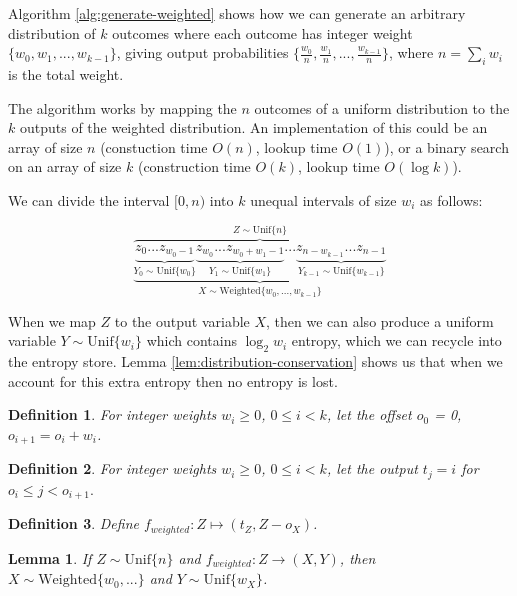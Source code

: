 \documentclass[12pt]{article}
\newtheorem{lemma}{Lemma}
\newtheorem{definition}{Definition}
\newcommand{\unif}[1]{\mathrm{Unif}\{#1\}}
\begin{document}
Algorithm \ref{alg:generate-weighted} shows how we can generate an arbitrary  distribution of $k$ outcomes where each outcome has integer weight $\{w_0, w_1, ..., w_{k-1}\}$, giving output probabilities $\{\frac{w_0}{n}, \frac{w_1}{n}, ..., \frac{w_{k-1}}{n}\}$, where $n=\sum_i w_i$ is the total weight.

The algorithm works by mapping the $n$ outcomes of a uniform distribution to the $k$ outputs of the weighted distribution. An implementation of this could be an array of size $n$ (constuction time $O(n)$, lookup time $O(1)$), or a binary search on an array of size $k$ (construction time $O(k)$, lookup time $O(\log k)$).

We can divide the interval $[0,n)$ into $k$ unequal intervals of size $w_i$ as follows:

\[
\overbrace{
    \underbrace{
        \underbrace{z_0 ... z_{w_0-1}}_{Y_0 \sim \unif{w_0}}
          \underbrace{z_{w_0} ... z_{w_0+w_1-1}}_{Y_1 \sim \unif{w_1}}
          ...
          \underbrace{
             z_{n-w_{k-1}} ... 
             z_{n-1}
         }_{Y_{k-1} \sim \unif{w_{k-1}}}
    }_{X \sim \mathrm{Weighted}\{w_0, ..., w_{k-1}\}}
}^{Z \sim \unif{n}}
\]

When we map $Z$ to the output variable $X$, then we can also produce a uniform variable $Y \sim \unif{w_i}$ which contains $\log_2w_i$ entropy, which we can recycle into the entropy store. Lemma \ref{lem:distribution-conservation} shows us that when we account for this extra entropy then no entropy is lost.

\begin{definition}
    \label{def:o}
    For integer weights $w_i \ge 0$, $0 \le i < k$, let the offset $o_0$ = 0, $o_{i+1} = o_i + w_i$.
\end{definition}

\begin{definition}
    \label{def:t}
    For integer weights $w_i \ge 0$, $0 \le i < k$, let the output $t_j = i$ for $o_i \le j < o_{i+1}.$
\end{definition}

\begin{definition}
    Define $f_{weighted}: Z \mapsto (t_Z, Z-o_X)$.
\end{definition}

\begin{lemma}
    If $Z \sim \unif{n}$ and $f_{weighted}: Z \rightarrow (X, Y)$, then $X \sim \mathrm{Weighted}\{w_0, ...\}$ and $Y \sim \unif{w_X}$.
\end{lemma}
\end{document}
